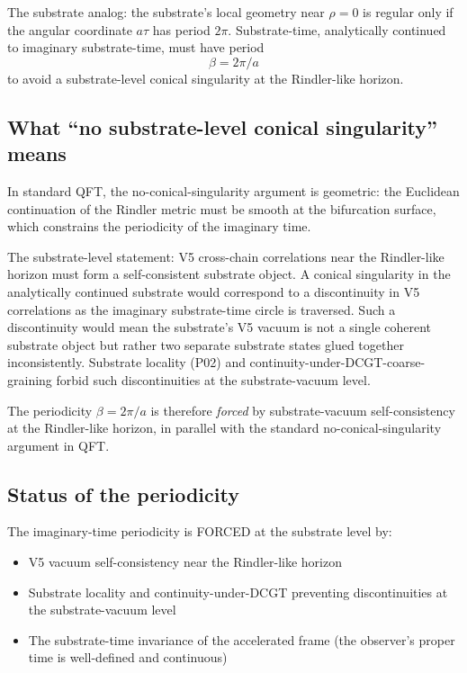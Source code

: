 \documentclass[11pt,a4paper]{article}
\begin{document}
The substrate analog: the substrate's local geometry near $\rho = 0$ is regular only if the angular coordinate $a\tau$ has period $2\pi$. Substrate-time, analytically continued to imaginary substrate-time, must have period
\[
\beta = 2\pi / a
\]
to avoid a substrate-level conical singularity at the Rindler-like horizon.

\subsection{What ``no substrate-level conical singularity'' means}

In standard QFT, the no-conical-singularity argument is geometric: the Euclidean continuation of the Rindler metric must be smooth at the bifurcation surface, which constrains the periodicity of the imaginary time.

The substrate-level statement: V5 cross-chain correlations near the Rindler-like horizon must form a self-consistent substrate object. A conical singularity in the analytically continued substrate would correspond to a discontinuity in V5 correlations as the imaginary substrate-time circle is traversed. Such a discontinuity would mean the substrate's V5 vacuum is not a single coherent substrate object but rather two separate substrate states glued together inconsistently. Substrate locality (P02) and continuity-under-DCGT-coarse-graining forbid such discontinuities at the substrate-vacuum level.

The periodicity $\beta = 2\pi/a$ is therefore \emph{forced} by substrate-vacuum self-consistency at the Rindler-like horizon, in parallel with the standard no-conical-singularity argument in QFT.

\subsection{Status of the periodicity}

The imaginary-time periodicity is FORCED at the substrate level by:
\begin{itemize}[noitemsep]
\item V5 vacuum self-consistency near the Rindler-like horizon
\item Substrate locality and continuity-under-DCGT preventing discontinuities at the substrate-vacuum level
\item The substrate-time invariance of the accelerated frame (the observer's proper time is well-defined and continuous)
\end{itemize}
\end{document}
